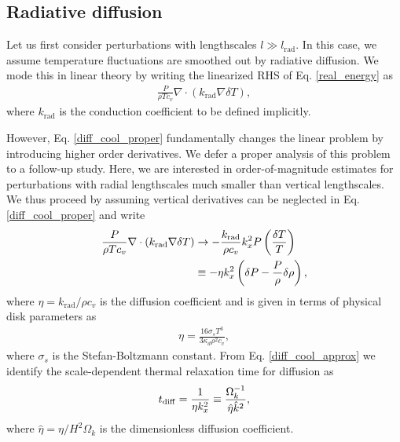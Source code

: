 \subsection{Radiative diffusion}
Let us first consider perturbations with lengthscales $l\gg
l_\mathrm{rad}$. In this case, we assume  
temperature fluctuations are smoothed out by radiative diffusion. We
mode this in linear theory by writing the linearized RHS of
Eq. \ref{real_energy} as 
\begin{align}\label{diff_cool_proper}
  \frac{P}{\rho T c_v} \nabla\cdot\left(k_\mathrm{rad}\nabla\delta
    T\right),  
\end{align}
where $k_\mathrm{rad}$ is the conduction coefficient to be defined
implicitly.

However, Eq. \ref{diff_cool_proper} fundamentally changes the linear problem by
introducing higher order derivatives. We defer a proper analysis of
this problem to a follow-up study. Here, we are interested in
order-of-magnitude estimates for perturbations with radial
lengthscales much smaller than vertical lengthscales. We thus proceed
by assuming vertical derivatives can be neglected in
Eq. \ref{diff_cool_proper} and write  
\begin{align}\label{diff_cool_approx}
  \frac{P}{\rho T c_v} \nabla\cdot\left(k_\mathrm{rad}\nabla\delta
    T\right) &\to -\frac{k_\mathrm{rad}}{\rho
    c_v}k_x^2P\left(\frac{\delta T}{T}\right)\notag\\
  &\equiv -\eta k_x^2 \left(\delta P - \frac{P}{\rho}\delta\rho\right), 
\end{align}
where $\eta=k_\mathrm{rad}/\rho c_v$ is the diffusion coefficient and
is given in terms of physical disk parameters as 
\begin{align}\label{eta_def}
  \eta = \frac{16\sigma_s T^3}{3\kappa_d\rho^2 c_v}, 
\end{align}
where $\sigma_s$ is the Stefan-Boltzmann constant. 
From Eq. \ref{diff_cool_approx} we identify the scale-dependent thermal relaxation
time for diffusion as 
\begin{align}\label{tc_diff_cool} 
  t_\mathrm{diff} = \frac{1}{\eta k_x^2}\equiv \frac{\Omega_k^{-1}}{\hat{\eta}\hat{k}^2}, 
\end{align}
where $\hat{\eta} = \eta/H^2\Omega_k$ is the 
dimensionless diffusion coefficient. 


